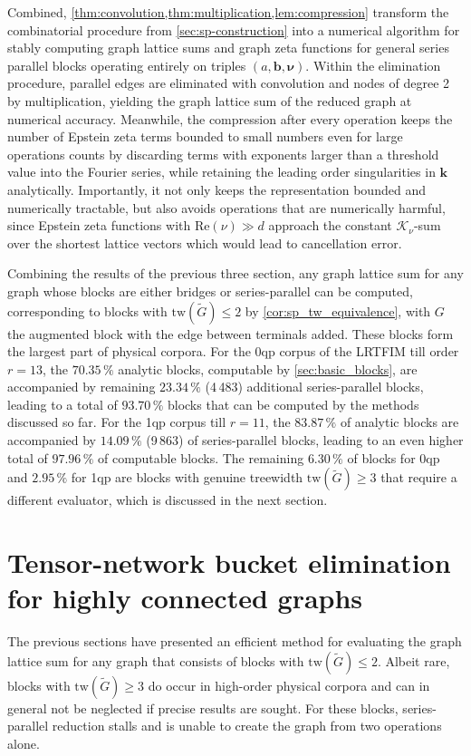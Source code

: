 \documentclass[]{amsart}
\numberwithin{mythm}{section}
\begin{document}
Combined, \cref{thm:convolution,thm:multiplication,lem:compression} transform the combinatorial procedure from \cref{sec:sp-construction} into a numerical algorithm for stably computing graph lattice sums and graph zeta functions for general series parallel blocks operating entirely on triples $(a,\bm b,\bm\nu)$. Within the elimination procedure, parallel edges are eliminated with convolution and nodes of degree 2 by multiplication, yielding the graph lattice sum of the reduced graph at numerical accuracy. Meanwhile, the compression after every operation keeps the number of Epstein zeta terms bounded to small numbers even for large operations counts by discarding terms with exponents larger than a threshold value into the Fourier series, while retaining the leading order singularities in $\bm k$ analytically. Importantly, it not only keeps the representation bounded and numerically tractable, but also avoids operations that are numerically harmful, since Epstein zeta functions with $\mathrm{Re}(\nu)\gg d$
approach the constant $\mathcal K_\nu$-sum over the shortest lattice vectors which would lead to cancellation error. 

Combining the results of the previous three section, any graph lattice sum for any graph whose blocks are either bridges or series-parallel can be computed, corresponding to blocks with $\mathrm{tw}(\tilde G)\le 2$ by \cref{cor:sp_tw_equivalence}, with $G$ the augmented block with the edge between terminals added. These blocks form the largest part of physical corpora. For the 0qp corpus  of the LRTFIM till order $r=13$, the $70.35\,\%$ analytic blocks, computable by \cref{sec:basic_blocks}, are accompanied by remaining $23.34\,\%$ (4\,483) additional series-parallel blocks, leading to a total of $93.70\,\%$ blocks that can be computed by the methods discussed so far. For the 1qp corpus till $r=11$, the $83.87\,\%$ of analytic blocks are accompanied by $14.09\,\%$ (9\,863) of series-parallel blocks, leading to an even higher total of $97.96\,\%$ of computable blocks. The remaining $6.30\,\%$ of blocks for 0qp and $2.95\,\%$ for 1qp are blocks with genuine treewidth $\mathrm{tw}(\tilde G)\ge 3$ that require a different evaluator, which is discussed in the next section.

\section{Tensor-network bucket elimination for highly connected graphs}
\label{sec:tensor}

The previous sections have presented an efficient method for evaluating the graph lattice sum for any graph that consists of blocks with $\mathrm{tw}(\tilde G)\le 2$. Albeit rare, blocks with $\mathrm{tw}(\tilde G)\ge 3$ do occur in high-order physical corpora and can in general not be neglected if precise results are sought. For these blocks, series-parallel reduction stalls and is unable to create the graph from two operations alone. 
\end{document}
